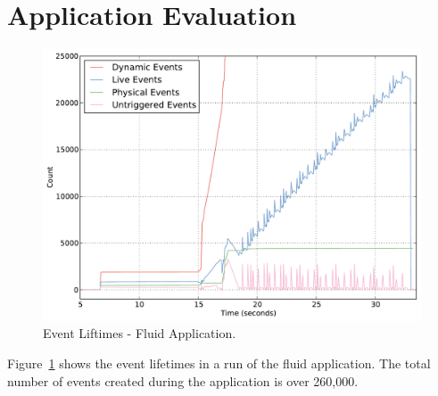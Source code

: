 
\section{Application Evaluation}
\label{sec:apps}

\begin{figure}
\begin{center}
\includegraphics[scale=0.33]{figs/event_lifetimes.pdf}
\end{center}
\vspace{-6mm}
\caption{Event Liftimes - Fluid Application.\label{fig:eventlife}}
\vspace{-4mm}
\end{figure}

Figure~\ref{fig:eventlife} shows the event lifetimes in a run of the fluid application.  The total number
of events created during the application is over 260,000.
